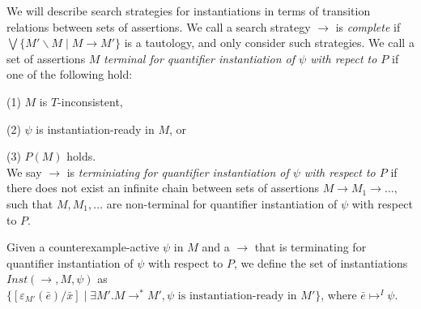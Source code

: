 \documentclass{llncs}
\begin{document}
\begin{comment}
Now, let us focus on identifying states in which there does not exist any useful instantiations with regards to assumptions about our counterexample.
The basic idea is to find a literal $\l \mapsto^I \psi$ in $M$ such that $\forall \bar{x}. \neg l[\bar{x}/\bar{e}]$ is satisifiable in $M$.
We call such a literal to be $\emph{compatible}$ in $M$.
For example, a EUF literal $f( t_1, \ldots, t_n ) = s$ is compatible if for all terms of the form $f( s_1, \ldots, s_n )$, we have that $t_1 \neq s_1, \ldots t_n \neq s_n$.
That is, the domain of $f( t_1, \ldots, t_n )$ is disjoint from all other terms with top symbol $f$.

Given a theory $T$, we will define search method that will drive the DPLL(T) search with splitting lemmas of the form $( l \vee \neg l )$.
The idea is to chose such lemmas such that the DPLL(T) search will either reach a state $M \parallel F$ such that $\psi$ is instantiation-ready in $M$, or there exists some literal $l \mapsto^I \psi$ that is compatible in $M$.
\end{comment}

We will describe search strategies for instantiations in terms of transition relations between sets of assertions.
We call a search strategy $\rightarrow$ is \emph{complete} if $\bigvee \{ M' \backslash M \mid M \rightarrow M' \}$ is a tautology, and only consider such strategies.
We call a set of assertions $M$ \emph{terminal for quantifier instantiation of $\psi$ with repect to $P$} if one of the following hold:

(1) $M$ is $T$-inconsistent,

(2) $\psi$ is instantiation-ready in $M$, or

(3) $P(M)$ holds. \\

We say $\rightarrow$ is \emph{terminiating for quantifier instantiation of $\psi$ with respect to $P$} if there does not exist an infinite chain between sets of assertions $M \rightarrow M_1 \rightarrow \ldots,$ such that $M, M_1, \ldots$ are non-terminal for quantifier instantiation of $\psi$ with respect to $P$.

Given a counterexample-active $\psi$ in $M$ and a $\rightarrow$ that is terminating for quantifier instantiation of $\psi$ with respect to $P$, we define the set of instantiations $Inst( \rightarrow, M, \psi )$ as $\{ [\varepsilon_{M'}(\bar{e})/\bar{x}] \mid \exists M'. M \rightarrow^\ast M', \psi \text{ is instantiation-ready in } M' \}$, where $\bar{e} \mapsto^I \psi$.
\end{document}
